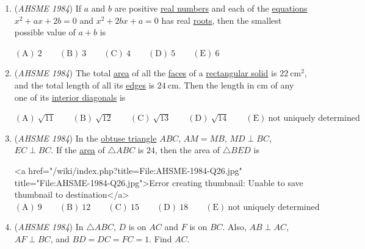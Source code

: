 \begin{enumerate}
 $\mathrm{(A) \ }\tan{10^\circ}+\tan{20^\circ} \qquad \mathrm{(B) \ }\tan{30^\circ} \qquad \mathrm{(C) \ } \frac{1}{2}(\tan{10^\circ}+\tan{20^\circ}) \qquad \mathrm{(D) \ }\tan{15^\circ} \qquad \mathrm{(E) \ } \frac{1}{4}\tan{60^\circ}$


	\item (\textit{AHSME 1984}) If $a$ and $b$ are positive \href{https://artofproblemsolving.com/wiki/index.php?title=Real\_numbers}{real numbers} and each of the \href{https://artofproblemsolving.com/wiki/index.php?title=Equation}{equations} $x^2+ax+2b=0$ and $x^2+2bx+a=0$ has real \href{https://artofproblemsolving.com/wiki/index.php?title=Root\_(polynomial)}{roots}, then the smallest possible value of $a+b$ is


 $\mathrm{(A) \ }2 \qquad \mathrm{(B) \ }3 \qquad \mathrm{(C) \ } 4 \qquad \mathrm{(D) \ }5 \qquad \mathrm{(E) \ } 6$


	\item (\textit{AHSME 1984}) The total \href{https://artofproblemsolving.com/wiki/index.php?title=Area}{area} of all the \href{https://artofproblemsolving.com/wiki/index.php?title=Faces}{faces} of a \href{https://artofproblemsolving.com/wiki/index.php?title=Rectangular\_prism}{rectangular solid} is $22 \ \text{cm}^2$, and the total length of all its \href{https://artofproblemsolving.com/wiki/index.php?title=Edges}{edges} is $24 \ \text{cm}$. Then the length in cm of any one of its \href{https://artofproblemsolving.com/wiki/index.php?title=Diagonal\#Polyhedra}{interior diagonals} is


 $\mathrm{(A) \ }\sqrt{11} \qquad \mathrm{(B) \ }\sqrt{12} \qquad \mathrm{(C) \ } \sqrt{13}\qquad \mathrm{(D) \ }\sqrt{14} \qquad \mathrm{(E) \ } \text{not uniquely determined}$


	\item (\textit{AHSME 1984}) In the \href{https://artofproblemsolving.com/wiki/index.php?title=Obtuse\_triangle}{obtuse triangle} $ABC$, $AM=MB$, $MD\perp BC$, $EC\perp BC$. If the \href{https://artofproblemsolving.com/wiki/index.php?title=Area}{area} of $\triangle ABC$ is $24$, then the area of $\triangle BED$ is


 <a href="/wiki/index.php?title=File:AHSME-1984-Q26.jpg" title="File:AHSME-1984-Q26.jpg">Error creating thumbnail: Unable to save thumbnail to destination</a>
$\mathrm{(A) \ }9 \qquad \mathrm{(B) \ }12 \qquad \mathrm{(C) \ } 15 \qquad \mathrm{(D) \ }18 \qquad \mathrm{(E) \ } \text{not uniquely determined}$


	\item (\textit{AHSME 1984}) In $\triangle ABC$, $D$ is on $AC$ and $F$ is on $BC$. Also, $AB\perp AC$, $AF\perp BC$, and $BD=DC=FC=1$. Find $AC$.



\end{enumerate}
